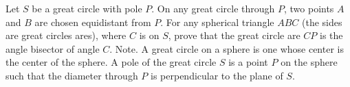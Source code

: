 Let $S$ be a great circle with pole $P$.  On any great circle through $P$,  two points $A$ and $B$ are chosen equidistant from $P$.  For any  spherical triangle  $ABC$ (the sides are great circles ares), where $C$ is on $S$,  prove that the great circle are $CP$ is the angle bisector of angle $C$. Note.   A great circle on a sphere is one whose center is the center of the sphere.  A pole of the great circle $S$ is a point $P$ on the sphere such that the diameter through $P$ is perpendicular to the plane of $S$.